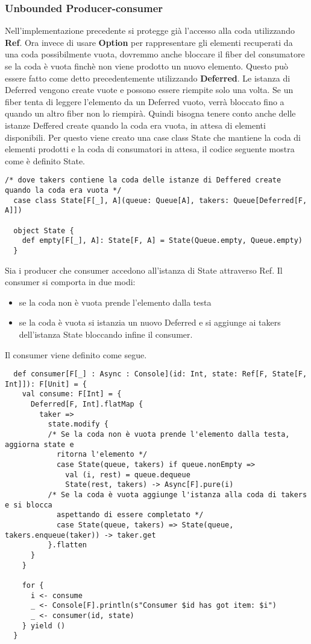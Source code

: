 \subsubsection{Unbounded Producer-consumer}
Nell'implementazione precedente  si protegge già l’accesso alla coda utilizzando
\textbf{Ref}. Ora invece di usare \textbf{Option} per rappresentare gli elementi recuperati da una coda possibilmente vuota, dovremmo anche bloccare il fiber del consumatore se la coda è vuota finchè non viene prodotto un nuovo elemento. Questo può essere fatto come detto
precedentemente utilizzando \textbf{Deferred}. Le istanza di Deferred vengono create vuote e
possono essere riempite solo una volta. Se un fiber tenta di leggere l’elemento da un
Deferred vuoto, verrà bloccato fino a quando un altro fiber non lo riempirà. Quindi bisogna tenere conto anche delle istanze Deffered create quando la coda era vuota, in attesa di elementi disponibili. Per questo viene creato una case class State che mantiene la coda di elementi prodotti e la coda di consumatori in attesa, il codice seguente mostra come è definito State. 
\begin{verbatim}
/* dove takers contiene la coda delle istanze di Deffered create quando la coda era vuota */
  case class State[F[_], A](queue: Queue[A], takers: Queue[Deferred[F, A]])

  object State {
    def empty[F[_], A]: State[F, A] = State(Queue.empty, Queue.empty)
  }
\end{verbatim}
\noindent Sia i producer che consumer accedono all’istanza di State attraverso Ref. Il consumer si comporta in due modi: 
\begin{itemize}
    \item se la coda non è vuota prende l’elemento dalla testa
    \item se la coda è vuota si istanzia un nuovo Deferred e si aggiunge ai takers dell’istanza State bloccando infine il consumer.
\end{itemize}

\noindent Il consumer viene definito come segue.
\begin{verbatim}
  def consumer[F[_] : Async : Console](id: Int, state: Ref[F, State[F, Int]]): F[Unit] = {
    val consume: F[Int] = {
      Deferred[F, Int].flatMap {
        taker =>
          state.modify {
          /* Se la coda non è vuota prende l'elemento dalla testa, aggiorna state e
            ritorna l'elemento */
            case State(queue, takers) if queue.nonEmpty => 
              val (i, rest) = queue.dequeue
              State(rest, takers) -> Async[F].pure(i) 
          /* Se la coda è vuota aggiunge l'istanza alla coda di takers e si blocca
            aspettando di essere completato */    
            case State(queue, takers) => State(queue, takers.enqueue(taker)) -> taker.get 
          }.flatten
      }
    }

    for {
      i <- consume
      _ <- Console[F].println(s"Consumer $id has got item: $i")
      _ <- consumer(id, state)
    } yield ()
  }
\end{verbatim}

